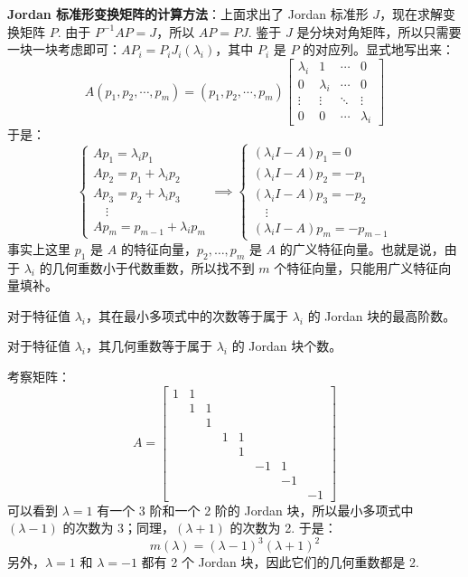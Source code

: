 \noindent\textbf{Jordan 标准形变换矩阵的计算方法}：上面求出了 Jordan 标准形 $J$，现在求解变换矩阵 $P$.
由于 $P^{-1}AP=J$，所以 $AP=PJ$.  鉴于 $J$ 是分块对角矩阵，所以只需要一块一块考虑即可：$AP_i=P_iJ_i(\lambda_i)$，其中 $P_i$ 是 $P$ 的对应列。显式地写出来：
\[
    A(p_1,p_2,\cdots,p_m)=(p_1,p_2,\cdots,p_m)
    \begin{bmatrix}
    \lambda_i&1&\cdots&0\\
    0&\lambda_i&\cdots&0\\
    \vdots&\vdots&\ddots&\vdots\\
    0&0&\cdots&\lambda_i
    \end{bmatrix}
\]
于是：
\[
    \begin{cases}
    Ap_1=\lambda_ip_1\\
    Ap_2=p_1+\lambda_ip_2\\
    Ap_3=p_2+\lambda_ip_3\\
    \quad\vdots\\
    Ap_m=p_{m-1}+\lambda_ip_m
    \end{cases}\implies
    \begin{cases}
    (\lambda_iI-A)p_1=0\\
    (\lambda_iI-A)p_2=-p_1\\
    (\lambda_iI-A)p_3=-p_2\\
    \quad\vdots\\
    (\lambda_iI-A)p_m=-p_{m-1}
    \end{cases}
\]
事实上这里 $p_1$ 是 $A$ 的特征向量，$p_2,\ldots,p_m$ 是 $A$ 的广义特征向量。也就是说，由于 $\lambda_i$ 的几何重数小于代数重数，所以找不到 $m$ 个特征向量，只能用广义特征向量填补。

\begin{theorem}
对于特征值 $\lambda_i$，其在最小多项式中的次数等于属于 $\lambda_i$ 的 Jordan 块的最高阶数。
\end{theorem}

\begin{theorem}
对于特征值 $\lambda_i$，其几何重数等于属于 $\lambda_i$ 的 Jordan 块个数。
\end{theorem}

\begin{example}
考察矩阵：
\[
    A=\begin{bmatrix}
    1&1&&&&&&\\
    &1&1&&&&&\\
    &&1&&&&&\\
    &&&1&1&&&\\
    &&&&1&&&\\
    &&&&&-1&1&\\
    &&&&&&-1&\\
    &&&&&&&-1
    \end{bmatrix}
\]
可以看到 $\lambda=1$ 有一个 3 阶和一个 2 阶的 Jordan 块，所以最小多项式中 $(\lambda-1)$ 的次数为 3；同理，$(\lambda+1)$ 的次数为 2. 于是：
\[
    m(\lambda)=(\lambda-1)^3(\lambda+1)^2
\]
另外，$\lambda=1$ 和 $\lambda=-1$ 都有 2 个 Jordan 块，因此它们的几何重数都是 2.
\end{example}

